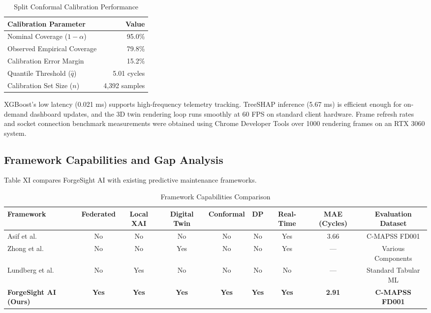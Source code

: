 \documentclass[letterpaper, 10 pt, conference]{ieeeconf}
\begin{document}
\begin{table}[htbp]
\caption{Split Conformal Calibration Performance}
\label{tab:conformal_perf}
\centering\small
\begin{tabular}{lr}
\toprule
\textbf{Calibration Parameter} & \textbf{Value} \\
\midrule
Nominal Coverage ($1-\alpha$) & 95.0\% \\
Observed Empirical Coverage & 79.8\% \\
Calibration Error Margin & 15.2\% \\
Quantile Threshold ($\hat{q}$) & 5.01 cycles \\
Calibration Set Size ($n$) & 4,392 samples \\
\bottomrule
\end{tabular}
\end{table}

XGBoost's low latency (0.021 ms) supports high-frequency telemetry tracking. TreeSHAP inference (5.67 ms) is efficient enough for on-demand dashboard updates, and the 3D twin rendering loop runs smoothly at 60 FPS on standard client hardware. Frame refresh rates and socket connection benchmark measurements were obtained using Chrome Developer Tools over 1000 rendering frames on an RTX 3060 system.

\subsection{Framework Capabilities and Gap Analysis}
\label{subsec:comparison}
Table XI compares ForgeSight AI with existing predictive maintenance frameworks.

\begin{table}[t]
\caption{Framework Capabilities Comparison}
\label{tab:comparison}
\centering\footnotesize
\begin{tabular}{lcccccccc}
\toprule
\textbf{Framework} & \textbf{Federated} & \textbf{Local XAI} & \textbf{Digital Twin} & \textbf{Conformal} & \textbf{DP} & \textbf{Real-Time} & \textbf{MAE (Cycles)} & \textbf{Evaluation Dataset} \\
\midrule
Asif et al.~\cite{asif2022} & No & No & No & No & No & Yes & 3.66 & C-MAPSS FD001 \\
Zhong et al.~\cite{zhong2023} & No & No & Yes & No & No & Yes & --- & Various Components \\
Lundberg et al.~\cite{lundberg2017} & No & Yes & No & No & No & No & --- & Standard Tabular ML \\
\textbf{ForgeSight AI (Ours)} & \textbf{Yes} & \textbf{Yes} & \textbf{Yes} & \textbf{Yes} & \textbf{Yes} & \textbf{Yes} & \textbf{2.91} & \textbf{C-MAPSS FD001} \\
\bottomrule
\end{tabular}
\end{table}
\end{document}

